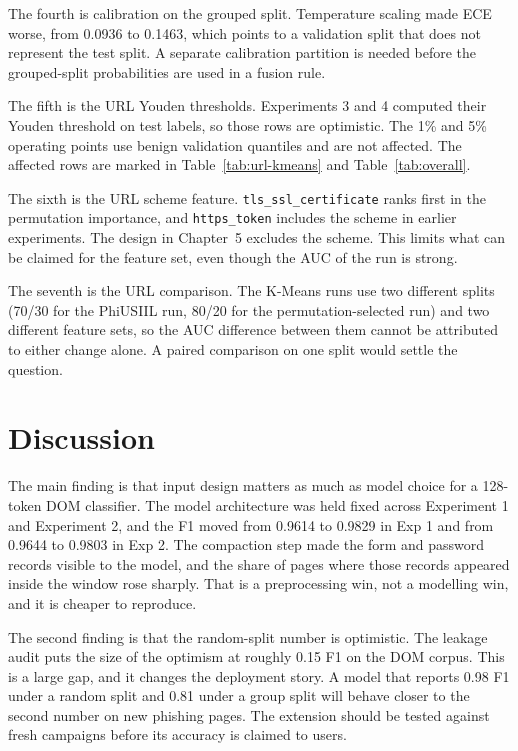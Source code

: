 \documentclass{FastFyp}
\begin{document}
The fourth is calibration on the grouped split. Temperature scaling made ECE worse, from 0.0936 to 0.1463, which points to a validation split that does not represent the test split. A separate calibration partition is needed before the grouped-split probabilities are used in a fusion rule.

The fifth is the URL Youden thresholds. Experiments 3 and 4 computed their Youden threshold on test labels, so those rows are optimistic. The 1\% and 5\% operating points use benign validation quantiles and are not affected. The affected rows are marked in Table~\ref{tab:url-kmeans} and Table~\ref{tab:overall}.

The sixth is the URL scheme feature. \texttt{tls\_ssl\_certificate} ranks first in the permutation importance, and \texttt{https\_token} includes the scheme in earlier experiments. The design in Chapter~5 excludes the scheme. This limits what can be claimed for the feature set, even though the AUC of the run is strong.

The seventh is the URL comparison. The K-Means runs use two different splits (70/30 for the PhiUSIIL run, 80/20 for the permutation-selected run) and two different feature sets, so the AUC difference between them cannot be attributed to either change alone. A paired comparison on one split would settle the question.

\section{Discussion}
\label{sec:discussion}

The main finding is that input design matters as much as model choice for a 128-token DOM classifier. The model architecture was held fixed across Experiment 1 and Experiment 2, and the F1 moved from 0.9614 to 0.9829 in Exp 1 and from 0.9644 to 0.9803 in Exp 2. The compaction step made the form and password records visible to the model, and the share of pages where those records appeared inside the window rose sharply. That is a preprocessing win, not a modelling win, and it is cheaper to reproduce.

The second finding is that the random-split number is optimistic. The leakage audit puts the size of the optimism at roughly 0.15 F1 on the DOM corpus. This is a large gap, and it changes the deployment story. A model that reports 0.98 F1 under a random split and 0.81 under a group split will behave closer to the second number on new phishing pages. The extension should be tested against fresh campaigns before its accuracy is claimed to users.
\end{document}
